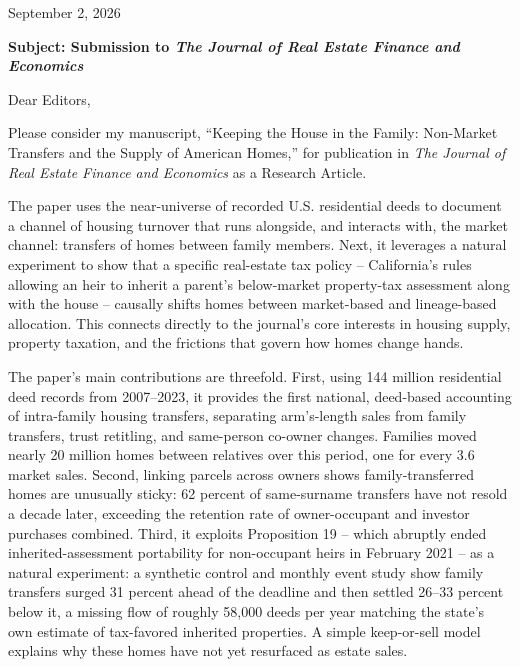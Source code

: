 \documentclass[12pt]{article}
\begin{document}
\begin{flushright}
September 2, 2026
\end{flushright}

\vspace{0.5em}

\textbf{Subject: Submission to \emph{The Journal of Real Estate Finance and Economics}}

\vspace{0.5em}

Dear Editors,

\vspace{0.5em}

Please consider my manuscript, ``Keeping the House in the Family: Non-Market Transfers and the Supply of American Homes,'' for publication in \emph{The Journal of Real Estate Finance and Economics} as a Research Article.

The paper uses the near-universe of recorded U.S. residential deeds to document a channel of housing turnover that runs alongside, and interacts with, the market channel: transfers of homes between family members. Next, it leverages a natural experiment to show that a specific real-estate tax policy -- California's rules allowing an heir to inherit a parent's below-market property-tax assessment along with the house -- causally shifts homes between market-based and lineage-based allocation. This connects directly to the journal's core interests in housing supply, property taxation, and the frictions that govern how homes change hands.

The paper's main contributions are threefold. First, using 144 million residential deed records from 2007--2023, it provides the first national, deed-based accounting of intra-family housing transfers, separating arm's-length sales from family transfers, trust retitling, and same-person co-owner changes. Families moved nearly 20 million homes between relatives over this period, one for every 3.6 market sales. Second, linking parcels across owners shows family-transferred homes are unusually sticky: 62 percent of same-surname transfers have not resold a decade later, exceeding the retention rate of owner-occupant and investor purchases combined. Third, it exploits Proposition 19 -- which abruptly ended inherited-assessment portability for non-occupant heirs in February 2021 -- as a natural experiment: a synthetic control and monthly event study show family transfers surged 31 percent ahead of the deadline and then settled 26--33 percent below it, a missing flow of roughly 58,000 deeds per year matching the state's own estimate of tax-favored inherited properties. A simple keep-or-sell model explains why these homes have not yet resurfaced as estate sales.
\end{document}
